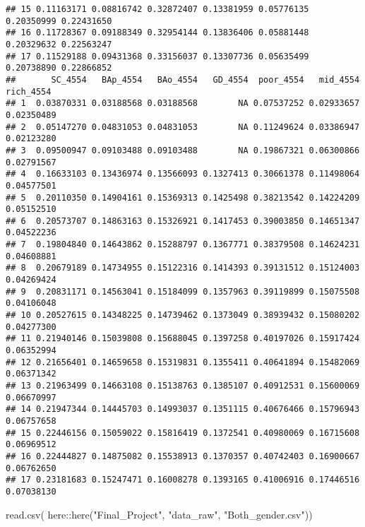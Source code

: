 \documentclass[
]{article}
\newenvironment{Shaded}{\begin{snugshade}}{\end{snugshade}}
\newcommand{\FunctionTok}[1]{\textcolor[rgb]{0.00,0.00,0.00}{#1}}
\newcommand{\NormalTok}[1]{#1}
\newcommand{\SpecialCharTok}[1]{\textcolor[rgb]{0.00,0.00,0.00}{#1}}
\newcommand{\StringTok}[1]{\textcolor[rgb]{0.31,0.60,0.02}{#1}}
\begin{document}
\begin{verbatim}
## 15 0.11163171 0.08816742 0.32872407 0.13381959 0.05776135 0.20350999 0.22431650
## 16 0.11728367 0.09188349 0.32954144 0.13836406 0.05881448 0.20329632 0.22563247
## 17 0.11529188 0.09431368 0.33156037 0.13307736 0.05635499 0.20738890 0.22866852
##       SC_4554   BAp_4554   BAo_4554   GD_4554  poor_4554   mid_4554  rich_4554
## 1  0.03870331 0.03188568 0.03188568        NA 0.07537252 0.02933657 0.02350489
## 2  0.05147270 0.04831053 0.04831053        NA 0.11249624 0.03386947 0.02123280
## 3  0.09500947 0.09103488 0.09103488        NA 0.19867321 0.06300866 0.02791567
## 4  0.16633103 0.13436974 0.13566093 0.1327413 0.30661378 0.11498064 0.04577501
## 5  0.20110350 0.14904161 0.15369313 0.1425498 0.38213542 0.14224209 0.05152510
## 6  0.20573707 0.14863163 0.15326921 0.1417453 0.39003850 0.14651347 0.04522236
## 7  0.19804840 0.14643862 0.15288797 0.1367771 0.38379508 0.14624231 0.04608881
## 8  0.20679189 0.14734955 0.15122316 0.1414393 0.39131512 0.15124003 0.04269424
## 9  0.20831171 0.14563041 0.15184099 0.1357963 0.39119899 0.15075508 0.04106048
## 10 0.20527615 0.14348225 0.14739462 0.1373049 0.38939432 0.15080202 0.04277300
## 11 0.21940146 0.15039808 0.15688045 0.1397258 0.40197026 0.15917424 0.06352994
## 12 0.21656401 0.14659658 0.15319831 0.1355411 0.40641894 0.15482069 0.06371342
## 13 0.21963499 0.14663108 0.15138763 0.1385107 0.40912531 0.15600069 0.06670997
## 14 0.21947344 0.14445703 0.14993037 0.1351115 0.40676466 0.15796943 0.06757658
## 15 0.22446156 0.15059022 0.15816419 0.1372541 0.40980069 0.16715608 0.06969512
## 16 0.22444827 0.14875082 0.15538913 0.1370357 0.40742403 0.16900667 0.06762650
## 17 0.23181683 0.15247471 0.16008278 0.1393165 0.41006916 0.17446516 0.07038130
\end{verbatim}

\begin{Shaded}
\begin{Highlighting}[]
\FunctionTok{read.csv}\NormalTok{(}
\NormalTok{  here}\SpecialCharTok{::}\FunctionTok{here}\NormalTok{(}\StringTok{"Final\_Project"}\NormalTok{, }\StringTok{"data\_raw"}\NormalTok{, }\StringTok{"Both\_gender.csv"}\NormalTok{))}
\end{Highlighting}
\end{Shaded}
\end{document}
